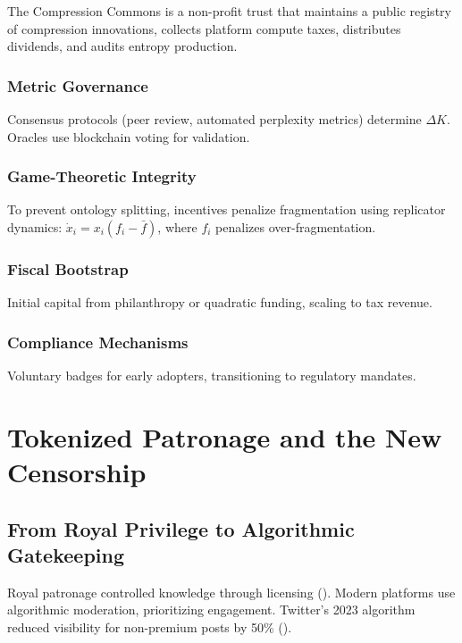 \documentclass[12pt]{article}
\begin{document}
The Compression Commons is a non-profit trust that maintains a public registry of compression innovations, collects platform compute taxes, distributes dividends, and audits entropy production.

\subsubsection{Metric Governance}

Consensus protocols (peer review, automated perplexity metrics) determine \(\Delta K\). Oracles use blockchain voting for validation.

\subsubsection{Game-Theoretic Integrity}

To prevent ontology splitting, incentives penalize fragmentation using replicator dynamics: \(\dot{x}_i = x_i (f_i - \bar{f})\), where \(f_i\) penalizes over-fragmentation.

\subsubsection{Fiscal Bootstrap}

Initial capital from philanthropy or quadratic funding, scaling to tax revenue.

\subsubsection{Compliance Mechanisms}

Voluntary badges for early adopters, transitioning to regulatory mandates.

\section{Tokenized Patronage and the New Censorship}

\subsection{From Royal Privilege to Algorithmic Gatekeeping}

Royal patronage controlled knowledge through licensing (\citealp{Biagioli2002}). Modern platforms use algorithmic moderation, prioritizing engagement. Twitter’s 2023 algorithm reduced visibility for non-premium posts by 50\% (\citealp{Noble2018}).
\end{document}
